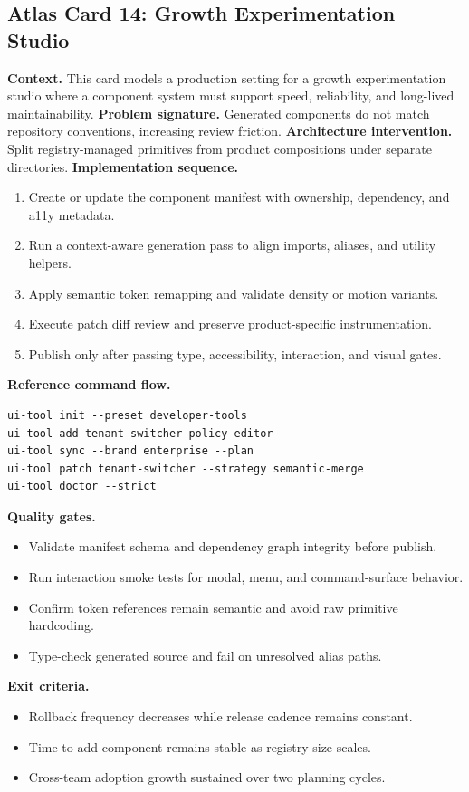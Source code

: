 \subsection*{Atlas Card 14: Growth Experimentation Studio}
\textbf{Context.} This card models a production setting for a growth experimentation studio where a component system must support speed, reliability, and long-lived maintainability.
\textbf{Problem signature.} Generated components do not match repository conventions, increasing review friction.
\textbf{Architecture intervention.} Split registry-managed primitives from product compositions under separate directories.
\textbf{Implementation sequence.}
\begin{enumerate}[leftmargin=*, itemsep=0.28em]
  \item Create or update the component manifest with ownership, dependency, and a11y metadata.
  \item Run a context-aware generation pass to align imports, aliases, and utility helpers.
  \item Apply semantic token remapping and validate density or motion variants.
  \item Execute patch diff review and preserve product-specific instrumentation.
  \item Publish only after passing type, accessibility, interaction, and visual gates.
\end{enumerate}
\textbf{Reference command flow.}
\begin{verbatim}
ui-tool init --preset developer-tools
ui-tool add tenant-switcher policy-editor
ui-tool sync --brand enterprise --plan
ui-tool patch tenant-switcher --strategy semantic-merge
ui-tool doctor --strict
\end{verbatim}
\textbf{Quality gates.}
\begin{itemize}[leftmargin=*, itemsep=0.24em]
  \item Validate manifest schema and dependency graph integrity before publish.
  \item Run interaction smoke tests for modal, menu, and command-surface behavior.
  \item Confirm token references remain semantic and avoid raw primitive hardcoding.
  \item Type-check generated source and fail on unresolved alias paths.
\end{itemize}
\textbf{Exit criteria.}
\begin{itemize}[leftmargin=*, itemsep=0.24em]
  \item Rollback frequency decreases while release cadence remains constant.
  \item Time-to-add-component remains stable as registry size scales.
  \item Cross-team adoption growth sustained over two planning cycles.
\end{itemize}
\clearpage
